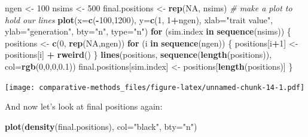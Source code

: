 \documentclass[]{article}
\newenvironment{Shaded}{\begin{snugshade}}{\end{snugshade}}
\newcommand{\CommentTok}[1]{\textcolor[rgb]{0.56,0.35,0.01}{\textit{#1}}}
\newcommand{\ControlFlowTok}[1]{\textcolor[rgb]{0.13,0.29,0.53}{\textbf{#1}}}
\newcommand{\DataTypeTok}[1]{\textcolor[rgb]{0.13,0.29,0.53}{#1}}
\newcommand{\DecValTok}[1]{\textcolor[rgb]{0.00,0.00,0.81}{#1}}
\newcommand{\FloatTok}[1]{\textcolor[rgb]{0.00,0.00,0.81}{#1}}
\newcommand{\KeywordTok}[1]{\textcolor[rgb]{0.13,0.29,0.53}{\textbf{#1}}}
\newcommand{\NormalTok}[1]{#1}
\newcommand{\OperatorTok}[1]{\textcolor[rgb]{0.81,0.36,0.00}{\textbf{#1}}}
\newcommand{\OtherTok}[1]{\textcolor[rgb]{0.56,0.35,0.01}{#1}}
\newcommand{\StringTok}[1]{\textcolor[rgb]{0.31,0.60,0.02}{#1}}
\begin{document}
\begin{Shaded}
\begin{Highlighting}[]
\NormalTok{ngen <-}\StringTok{ }\DecValTok{100}
\NormalTok{nsims <-}\StringTok{ }\DecValTok{500}
\NormalTok{final.positions <-}\StringTok{ }\KeywordTok{rep}\NormalTok{(}\OtherTok{NA}\NormalTok{, nsims)}
\CommentTok{# make a plot to hold our lines}
\KeywordTok{plot}\NormalTok{(}\DataTypeTok{x=}\KeywordTok{c}\NormalTok{(}\OperatorTok{-}\DecValTok{100}\NormalTok{,}\DecValTok{1200}\NormalTok{), }\DataTypeTok{y=}\KeywordTok{c}\NormalTok{(}\DecValTok{1}\NormalTok{, }\DecValTok{1}\OperatorTok{+}\NormalTok{ngen), }\DataTypeTok{xlab=}\StringTok{"trait value"}\NormalTok{, }\DataTypeTok{ylab=}\StringTok{"generation"}\NormalTok{, }\DataTypeTok{bty=}\StringTok{"n"}\NormalTok{, }\DataTypeTok{type=}\StringTok{"n"}\NormalTok{)}
\ControlFlowTok{for}\NormalTok{ (sim.index }\ControlFlowTok{in} \KeywordTok{sequence}\NormalTok{(nsims)) \{}
\NormalTok{  positions <-}\StringTok{ }\KeywordTok{c}\NormalTok{(}\DecValTok{0}\NormalTok{, }\KeywordTok{rep}\NormalTok{(}\OtherTok{NA}\NormalTok{,ngen))}
  \ControlFlowTok{for}\NormalTok{ (i }\ControlFlowTok{in} \KeywordTok{sequence}\NormalTok{(ngen)) \{}
\NormalTok{    positions[i}\OperatorTok{+}\DecValTok{1}\NormalTok{] <-}\StringTok{ }\NormalTok{positions[i] }\OperatorTok{+}\StringTok{ }\KeywordTok{rweird}\NormalTok{()}
\NormalTok{  \}}
  \KeywordTok{lines}\NormalTok{(positions, }\KeywordTok{sequence}\NormalTok{(}\KeywordTok{length}\NormalTok{(positions)), }\DataTypeTok{col=}\KeywordTok{rgb}\NormalTok{(}\DecValTok{0}\NormalTok{,}\DecValTok{0}\NormalTok{,}\DecValTok{0}\NormalTok{,}\FloatTok{0.1}\NormalTok{))}
\NormalTok{  final.positions[sim.index] <-}\StringTok{ }\NormalTok{positions[}\KeywordTok{length}\NormalTok{(positions)]}
\NormalTok{\}}
\end{Highlighting}
\end{Shaded}

\texttt{[image: comparative-methods\_files/figure-latex/unnamed-chunk-14-1.pdf]}

And now let's look at final positions again:

\begin{Shaded}
\begin{Highlighting}[]
\KeywordTok{plot}\NormalTok{(}\KeywordTok{density}\NormalTok{(final.positions), }\DataTypeTok{col=}\StringTok{"black"}\NormalTok{, }\DataTypeTok{bty=}\StringTok{"n"}\NormalTok{)}
\end{Highlighting}
\end{Shaded}
\end{document}
